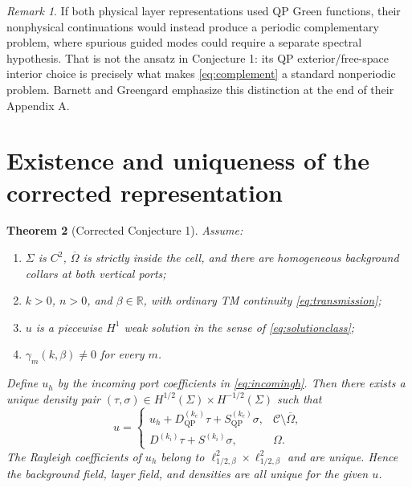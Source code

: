 \documentclass[11pt]{article}
\newcommand{\C}{\mathcal C}
\newcommand{\Om}{\Omega}
\newcommand{\Sig}{\Sigma}
\newcommand{\R}{\mathbb R}
\newcommand{\QP}{\mathrm{QP}}
\theoremstyle{plain}
\newtheorem{theorem}{Theorem}[section]
\theoremstyle{definition}
\theoremstyle{remark}
\newtheorem{remark}[theorem]{Remark}
\begin{document}
\begin{remark}
If both physical layer representations used QP Green functions, their
nonphysical continuations would instead produce a periodic complementary
problem, where spurious guided modes could require a separate spectral
hypothesis.  That is not the ansatz in Conjecture 1: its QP exterior/free-space
interior choice is precisely what makes \eqref{eq:complement} a standard
nonperiodic problem.  Barnett and Greengard emphasize this distinction at the
end of their Appendix A.
\end{remark}

\section{Existence and uniqueness of the corrected representation}
\label{sec:corrected}

\begin{theorem}[Corrected Conjecture 1]
\label{thm:corrected}
Assume:
\begin{enumerate}[label=(\roman*)]
\item \(\Sig\) is \(C^2\), \(\overline\Om\) is strictly inside the cell, and
there are homogeneous background collars at both vertical ports;
\item \(k>0\), \(n>0\), and \(\beta\in\R\), with ordinary TM continuity
\eqref{eq:transmission};
\item \(u\) is a piecewise \(H^1\) weak solution in the sense of
\eqref{eq:solutionclass};
\item \(\gamma_m(k,\beta)\neq0\) for every \(m\).
\end{enumerate}
Define \(u_h\) by the incoming port coefficients in
\eqref{eq:incomingh}.  Then there exists a unique density pair
\((\tau,\sigma)\in H^{1/2}(\Sig)\times H^{-1/2}(\Sig)\) such that
\begin{equation}
u=\begin{cases}
u_h+D_{\QP}^{(k_e)}\tau+S_{\QP}^{(k_e)}\sigma,
&\C\setminus\overline\Om,\\
D^{(k_i)}\tau+S^{(k_i)}\sigma,&\Om.
\end{cases}
\label{eq:correctedrep}
\end{equation}
The Rayleigh coefficients of \(u_h\) belong to
\(\ell^2_{1/2,\beta}\times\ell^2_{1/2,\beta}\) and are unique.  Hence the
background field, layer field, and densities are all unique for the given
\(u\).
\end{theorem}
\end{document}
